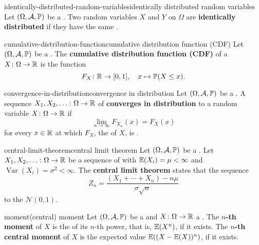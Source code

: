 \begin{topic}{identically-distributed-random-variables}{identically distributed random variables}
    Let $(\Omega, \mathcal{A}, \mathbb{P})$ be a . Two random variables $X$ and $Y$ on $\Omega$ are \textbf{identically distributed} if they have the same .
\end{topic}

\begin{topic}{cumulative-distribution-function}{cumulative distribution function (CDF)}
    Let $(\Omega, \mathcal{A}, \mathbb{P})$ be a . The \textbf{cumulative distribution function (CDF)} of a  $X \colon \Omega \to \mathbb{R}$ is the function
    \[ F_X \colon \mathbb{R} \to [0, 1], \quad x \mapsto \mathbb{P}(X \le x) . \]
\end{topic}

\begin{topic}{convergence-in-distribution}{convergence in distribution}
    Let $(\Omega, \mathcal{A}, \mathbb{P})$ be a . A sequence $X_1, X_2, \ldots \colon \Omega \to \mathbb{R}$ of  \textbf{converges in distribution} to a random variable $X \colon \Omega \to \mathbb{R}$ if
    \[ \lim_{n \to \infty} F_{X_n}(x) = F_X(x) \]
    for every $x \in \mathbb{R}$ at which $F_X$, the  of $X$, is . 
\end{topic}

\begin{topic}{central-limit-theorem}{central limit theorem}
    Let $(\Omega, \mathcal{A}, \mathbb{P})$ be a . Let $X_1, X_2, \ldots \colon \Omega \to \mathbb{R}$ be a sequence of    with  $\mathbb{E}(X_i) = \mu < \infty$ and  $\operatorname{Var}(X_i) = \sigma^2 < \infty$. The \textbf{central limit theorem} states that the sequence
    \[ Z_n = \frac{(X_1 + \cdots + X_n) - n \mu}{\sigma \sqrt{n}} \]
     to the  $\mathcal{N}(0, 1)$.
\end{topic}

\begin{topic}{moment}{(central) moment}
    Let $(\Omega, \mathcal{A}, \mathbb{P})$ be a  and $X \colon \Omega \to \mathbb{R}$ a . The \textbf{$n$-th moment} of $X$ is the  of its $n$-th power, that is, $\mathbb{E}(X^n)$, if it exists. The \textbf{$n$-th central moment} of $X$ is the expected value $\mathbb{E}((X - \mathbb{E}(X))^n)$, if it exists. 
\end{topic}

